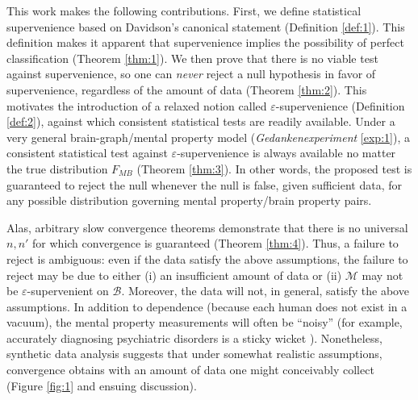 \documentclass{article}
\newcommand{\eps}{\varepsilon}
\providecommand{\mc}[1]{\mathcal{#1}}
\begin{document}

This work makes the following contributions.  First, we define statistical supervenience based on Davidson's canonical statement (Definition \ref{def:1}).  This definition makes it apparent that supervenience implies the possibility of perfect classification (Theorem \ref{thm:1}).  
We then prove that there is no viable test against supervenience, so one can \emph{never} reject a null hypothesis in favor of supervenience, regardless of the amount of data (Theorem \ref{thm:2}).  This motivates the introduction of a relaxed notion called $\eps$-supervenience (Definition \ref{def:2}), against which consistent statistical tests are readily available. Under a very general brain-graph/mental property model (\emph{Gedankenexperiment} \ref{exp:1}),  a consistent statistical test against $\eps$-supervenience is always available no matter the true distribution $F_{MB}$ (Theorem \ref{thm:3}).  
In other words, the proposed test is guaranteed to reject the null whenever the null is false, given sufficient data, for any possible distribution governing mental property/brain property pairs. 

Alas, arbitrary slow convergence theorems demonstrate that there is no universal $n,n'$ for which convergence is guaranteed (Theorem \ref{thm:4}).  Thus, a failure to reject is ambiguous: even if the data satisfy the above assumptions, the failure to reject may be due to either (i) an insufficient amount of data or (ii) $\mc{M}$ may not be $\eps$-supervenient on $\mc{B}$.  Moreover, the data will not, in general, satisfy the above assumptions.  In addition to dependence (because each human does not exist in a vacuum), the mental property measurements will often be ``noisy'' (for example, accurately diagnosing psychiatric disorders is a sticky wicket \cite{Kessler2005}). 
% 
Nonetheless, synthetic data analysis suggests that under somewhat realistic assumptions, convergence obtains with an amount of data one might conceivably collect (Figure \ref{fig:1} and ensuing discussion).  
\end{document}
